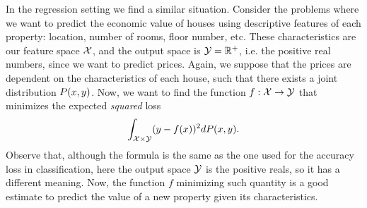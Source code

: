 %
In the regression setting we find a similar situation. Consider the problems where we want to predict the economic value of houses using descriptive features of each property: location, number of rooms, floor number, etc. These characteristics are our feature space $\mathcal{X}$, and the output space is $\mathcal{Y} = \mathbb{R}^+$, i.e. the positive real numbers, since we want to predict prices. Again, we suppose that the prices are dependent on the characteristics of each house, such that there exists a joint distribution $P(x, y)$.
Now, we want to find the function $f: \mathcal{X} \to \mathcal{Y}$ that minimizes the expected \emph{squared} loss
$$ \int_{\mathcal{X} \times \mathcal{Y}} (y - f(x))^2 dP(x, y) .$$
Observe that, although the formula is the same as the one used for the accuracy loss in classification, here the output space $\mathcal{Y}$ is the positive reals, so it has a different meaning. Now, the function $f$ minimizing such quantity is a good estimate to predict the value of a new property given its characteristics.

